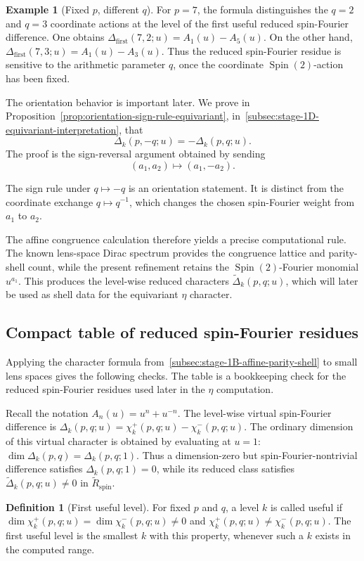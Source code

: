 \documentclass{article}
\theoremstyle{definition}
\newtheorem{definition}[theorem]{Definition}
\newtheorem{example}[theorem]{Example}
\numberwithin{equation}{section}
\begin{document}
\begin{example}[Fixed $p$, different $q$]
For $p=7$, the formula distinguishes the $q=2$ and $q=3$ coordinate actions at the level of the first useful reduced spin-Fourier difference.  One obtains $\Delta_{\text{first}}(7,2;u)=A_1(u)-A_5(u).$ On the other hand, $\Delta_{\text{first}}(7,3;u)=A_1(u)-A_3(u).$ Thus the reduced spin-Fourier residue is sensitive to the arithmetic parameter $q$, once the coordinate $\operatorname{Spin}(2)$-action has been fixed.
\end{example}

The orientation behavior is important later.  We prove in Proposition~\ref{prop:orientation-sign-rule-equivariant}, in~\autoref{subsec:stage-1D-equivariant-interpretation}, that
\begin{equation}
\Delta_k(p,-q;u)=-\Delta_k(p,q;u).
\end{equation}
The proof is the sign-reversal argument obtained by sending
\begin{equation}
(a_1,a_2)\longmapsto(a_1,-a_2).
\end{equation}

The sign rule under $q\mapsto -q$ is an orientation statement.  It is distinct from the coordinate exchange $q\mapsto q^{-1}$, which changes the chosen spin-Fourier weight from $a_1$ to $a_2$.

The affine congruence calculation therefore yields a precise computational rule.  The known lens-space Dirac spectrum provides the congruence lattice and parity-shell count, while the present refinement retains the $\operatorname{Spin}(2)$-Fourier monomial $u^{a_1}$.  This produces the level-wise reduced characters $\widetilde\Delta_k(p,q;u)$, which will later be used as shell data for the equivariant $\eta$ character.

\subsection{Compact table of reduced spin-Fourier residues}
\label{subsec:stage-1C-first-table}

Applying the character formula from~\autoref{subsec:stage-1B-affine-parity-shell} to small lens spaces gives the following checks.  The table is a bookkeeping check for the reduced spin-Fourier residues used later in the $\eta$ computation.

Recall the notation $A_n(u)=u^n+u^{-n}.$ The level-wise virtual spin-Fourier difference is $\Delta_k(p,q;u)=\chi_k^+(p,q;u)-\chi_k^-(p,q;u).$ The ordinary dimension of this virtual character is obtained by evaluating at $u=1$: $\dim \Delta_k(p,q)=\Delta_k(p,q;1).$ Thus a dimension-zero but spin-Fourier-nontrivial difference satisfies $\Delta_k(p,q;1)=0$, while its reduced class satisfies $\widetilde\Delta_k(p,q;u)\neq 0$ in $\widetilde R_{\operatorname{spin}}$. \begin{definition}[First useful level]
For fixed $p$ and $q$, a level $k$ is called useful if $\dim \chi_k^+(p,q;u)=\dim \chi_k^-(p,q;u)\neq 0$ and $\chi_k^+(p,q;u)\neq \chi_k^-(p,q;u).$ The first useful level is the smallest $k$ with this property, whenever such a $k$ exists in the computed range.
\end{definition}
\end{document}
